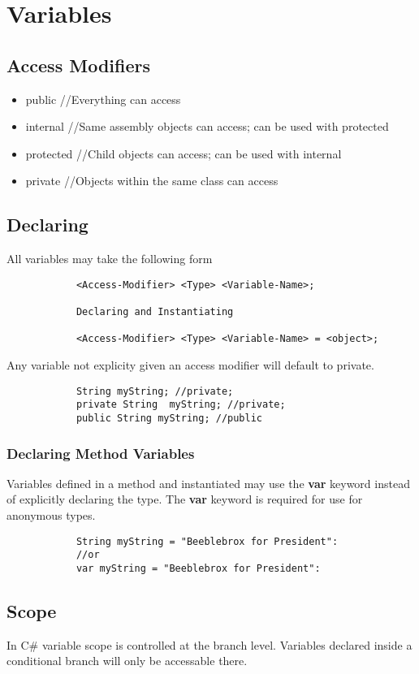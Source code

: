 \documentclass {amsart}
\begin{document}
\section{Variables}
	\subsection{Access Modifiers}
		\begin{itemize}
			\item public 		//Everything can access
			\item internal 	//Same assembly objects can access; can be used with protected
			\item protected	//Child objects can access; can be used with internal
			\item private		//Objects within the same class can access
		\end{itemize}
	\subsection{Declaring}  All variables may take the following form
		\begin{verbatim}
			<Access-Modifier> <Type> <Variable-Name>;

 			Declaring and Instantiating

			<Access-Modifier> <Type> <Variable-Name> = <object>;
		\end{verbatim}
		Any variable not explicity given an access modifier will default to private. 
		\begin{lstlisting}
			String myString; //private;
			private String  myString; //private;
			public String myString; //public
		\end{lstlisting}

	\subsubsection {Declaring Method Variables}
		Variables defined in a method and instantiated may use the {\bf var} keyword instead of explicitly declaring the type.  The {\bf var} keyword is required for use for anonymous types.
		\begin{lstlisting}
			String myString = "Beeblebrox for President":
			//or 
 			var myString = "Beeblebrox for President":
		\end{lstlisting}
		  

	\subsection {Scope}  In C\# variable scope is controlled at the branch level.  Variables declared inside a conditional branch will only be accessable there. 
\end{document}
